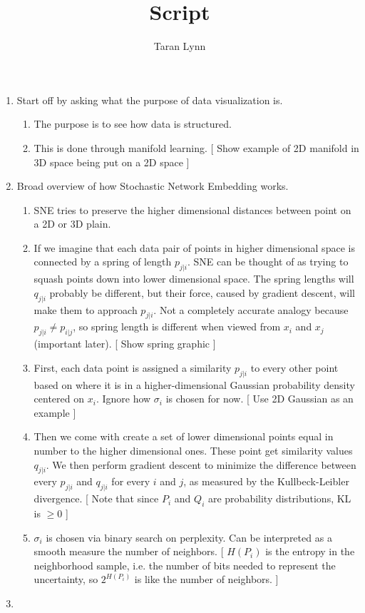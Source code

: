 \documentclass[12pt]{article}
\title{Script}
\author{Taran Lynn}
\date{}
\begin{document}
\maketitle

\begin{enumerate}
\item Start off by asking what the purpose of data visualization is.
  \begin{enumerate}
  \item The purpose is to see how data is structured.

  \item This is done through manifold learning.
    [ Show example of 2D manifold in 3D space being put on a 2D space ]
  \end{enumerate}
  
\item Broad overview of how Stochastic Network Embedding works.
  \begin{enumerate}
  \item SNE tries to preserve the higher dimensional distances
    between point on a 2D or 3D plain.
    
  \item If we imagine that each data pair of points in higher
    dimensional space is connected by a spring of length $p_{j|i}$.
    SNE can be thought of as trying to squash points down into lower
    dimensional space.
    The spring lengths will $q_{j|i}$ probably be different, but their
    force, caused by gradient descent, will make them to approach
    $p_{j|i}$.
    Not a completely accurate analogy because $p_{j|i} \neq p_{i|j}$,
    so spring length is different when viewed from $x_i$ and $x_j$
    (important later).
    [ Show spring graphic ]

  \item First, each data point is assigned a similarity $p_{j|i}$ to
    every other point based on where it is in a higher-dimensional
    Gaussian probability density centered on $x_i$.
    Ignore how $\sigma_i$ is chosen for now.
    [ Use 2D Gaussian as an example ]

  \item Then we come with create a set of lower dimensional points
    equal in number to the higher dimensional ones.
    These point get similarity values $q_{j|i}$.
    We then perform gradient descent to minimize the difference
    between every $p_{j|i}$ and $q_{j|i}$ for every $i$ and $j$, as
    measured by the Kullbeck-Leibler divergence.
    [ Note that since $P_i$ and $Q_i$ are probability distributions, KL is $\ge 0$ ]

  \item $\sigma_i$ is chosen via binary search on perplexity.
    Can be interpreted as a smooth measure the number of neighbors.
    [ $H(P_i)$ is the entropy in the neighborhood sample, i.e. the
    number of bits needed to represent the uncertainty, so $2^{H(P_i)}$ is
    like the number of neighbors. ]
  \end{enumerate}

\item {}
\end{enumerate}
\end{document}
